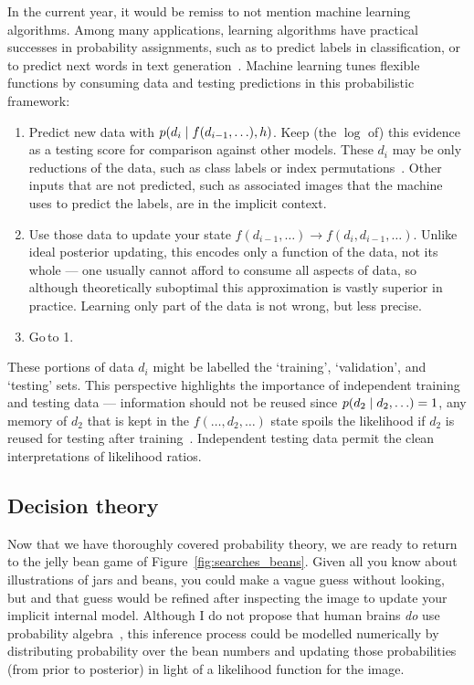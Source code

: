 In the current year, it would be remiss to not mention machine learning
algorithms.
Among many applications, learning algorithms have practical successes in
probability assignments, such as to predict labels in classification,
or to predict next words in text generation~\cite{
MurphyKevinP.2012Mlap,
radford2019language
}.
Machine learning tunes flexible functions by consuming data and testing
predictions in this probabilistic framework:
\begin{enumerate}
\item Predict new data with $p(d_i \mid f(d_{i-1}, \ldots), h)$.
Keep (the $\log$ of) this evidence as a testing score for comparison against
other models.
These $d_i$ may be only reductions of the data, such as class labels
or index permutations~\cite{Noroozi2016jigsaw, multitaskself2017}.
Other inputs that are not predicted, such as associated images that the machine
uses to predict the labels, are in the implicit context.
\item Use those data to update your state
$f(d_{i-1}, \ldots) \to f(d_i, d_{i-1}, \ldots)$.
Unlike ideal posterior updating, this encodes only a function of the data, not
its whole --- one usually cannot afford to consume all aspects of data, so
although theoretically suboptimal this approximation is vastly superior in
practice.
Learning only part of the data is not wrong, but less precise.
\item Go\,to 1.
\end{enumerate}
These portions of data $d_i$ might be labelled the `training', `validation',
and `testing' sets.
This perspective highlights the importance of independent training and testing
data --- information should not be reused since
$p(d_2 \mid d_2, \ldots) = 1$, any memory of $d_2$ that is kept
in the $f(\ldots, d_2, \ldots)$ state spoils the likelihood if $d_2$ is reused
for testing after training~\cite{sivia2006data}.
Independent testing data permit the clean interpretations of likelihood ratios.


\subsection{Decision theory}
Now that we have thoroughly covered probability theory, we are ready to return
to the jelly bean game of Figure~\ref{fig:searches_beans}.
Given all you know about illustrations of jars and beans, you could make a
vague guess without looking, but and that guess would be refined after
inspecting the image to update your implicit internal model.
Although I do not propose that human brains \emph{do} use probability
algebra~\cite{jaynes1988brain}, this inference process could be modelled
numerically by distributing probability over the bean numbers
and updating those probabilities (from prior to posterior) in light of a
likelihood function for the image.

